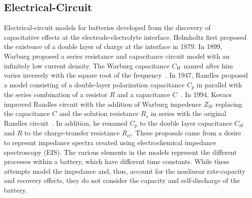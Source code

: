 \documentclass[../zhang_thesis.tex]{subfiles}
\begin{document}
\subsection{Electrical-Circuit}

Electrical-circuit models for batteries developed from the discovery of capacitative effects at the electrode-electrolyte interface. Helmholtz first proposed the existence of a double layer of charge at the interface in 1879. In 1899, Warburg proposed a series resistance and capacitance circuit model with an infinitely low current density. The Warburg capacitance $C_W$ named after him varies inversely with the square root of the frequency~\cite{geddes97}. In 1947, Randles proposed a model
consisting of a double-layer polarization capacitance $C_p$ in parallel with the series combination of a resistor $R$ and a capacitance $C$~\cite{randles47}. In 1994, Kovacs improved Randles circuit with the addition of Warburg impedence $Z_W$ replacing the capacitance $C$ and the solution resistance $R_s$ in series with the original Randles circuit~\cite{kovacs95}. In addition, he renamed $C_p$ to the double layer capacitance $C_{dl}$ and $R$ to the charge-transfer resistance
$R_{ct}$. These proposals came from a desire to represnt impedance spectra created using electrochemical impedance spectroscopy (EIS). The various elements in the models represent the different processes within a battery, which have different time constants. While these attempts model the impedance and, thus, account for the nonlinear rate-capacity and recovery effects, they do not consider the capacity and self-discharge of the battery.


\end{document}
